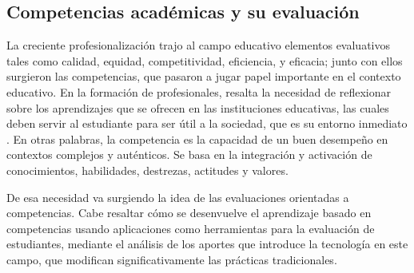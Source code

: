 

\subsection{Competencias académicas y su evaluación}
La creciente profesionalización trajo al campo educativo elementos evaluativos tales como calidad, equidad, competitividad, eficiencia, y eficacia; junto con ellos surgieron las competencias, que pasaron a jugar papel importante en el contexto educativo. En la formación de profesionales, resalta la necesidad de reflexionar sobre los aprendizajes que se ofrecen en las instituciones educativas, las cuales deben servir al estudiante para ser útil a la sociedad, que es su entorno inmediato \citep{kuh_using_2015}. En otras palabras, la competencia es la capacidad de un buen desempeño en contextos complejos y auténticos. Se basa en la integración y activación de conocimientos, habilidades, destrezas, actitudes y valores.

De esa necesidad va surgiendo la idea de las evaluaciones orientadas a competencias. Cabe resaltar cómo se desenvuelve el aprendizaje basado en competencias usando aplicaciones como herramientas para la evaluación de estudiantes, mediante el análisis de los aportes que introduce la tecnología en este campo, que modifican significativamente las prácticas tradicionales\citep{carriveau_connecting_2016}.


